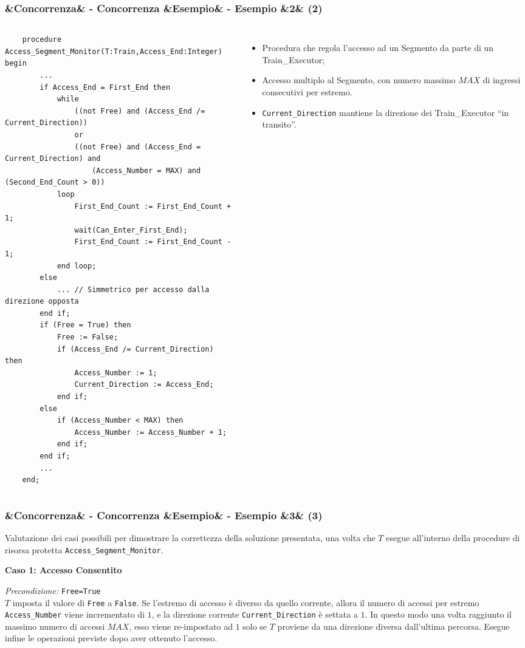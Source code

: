 \documentclass[slidestop,compress,blackandwhite]{beamer}
\newcommand{\ttt}[1]{\texttt{#1}}
\newcommand{\ii}[1]{\textit{#1}}
\newcommand{\cm}[1]{\vspace{#1cm}}
\newcommand{\describe}[2]{
	\textbf{#1}\\
	\begin{addmargin}[2em]{0em}
		#2
	\end{addmargin}
}
\newcommand{\newtitle}[4]{
	#1 
	\ifx&#2&%
	\else
  		\large- #2
	\fi
	\ifx&#3&%
	\else
  		\small- #3
	\fi
	\ifx&#4&%
	\else
  		\normalsize (#4)
	\fi
}
\newcommand{\newframe}[5]{
	\begin{frame}
		\frametitle{\newtitle{#1}{#2}{#3}{#4}}
		#5
	\end{frame}
}
\newcommand{\myitemize}[1]{
	\begin{itemize}\itemsep4pt
	#1
	\end{itemize}
}
\begin{document}
	\begin{frame}[fragile]
	\frametitle{\newtitle{}{Concorrenza}{Esempio}{2}}
	\begin{columns}
	\vspace{-1.1cm}
	\tiny\begin{verbatim}
    procedure Access_Segment_Monitor(T:Train,Access_End:Integer) begin
        ...
        if Access_End = First_End then
            while 
                ((not Free) and (Access_End /= Current_Direction)) 
                or
                ((not Free) and (Access_End = Current_Direction) and 
                    (Access_Number = MAX) and (Second_End_Count > 0)) 
            loop
                First_End_Count := First_End_Count + 1;
                wait(Can_Enter_First_End);
                First_End_Count := First_End_Count - 1;
            end loop;
        else
            ... // Simmetrico per accesso dalla direzione opposta
        end if;
        if (Free = True) then
            Free := False;
            if (Access_End /= Current_Direction) then
                Access_Number := 1;
                Current_Direction := Access_End;
            end if;
        else
            if (Access_Number < MAX) then
                Access_Number := Access_Number + 1;
            end if;
        end if;
        ...
    end;
\end{verbatim}
		\footnotesize
		\myitemize{
			\item Procedura che regola l'accesso ad un Segmento da parte di un Train\_Executor;
			\item Accesso multiplo al Segmento, con numero massimo $MAX$ di ingressi consecutivi per estremo.
			\item \ttt{Current\_Direction} mantiene la direzione dei Train\_Executor ``in transito''.
		}
	\end{columns}
	\end{frame}

	
	\newframe{}{Concorrenza}{Esempio}{3}{
		\footnotesize
		\cm{0.5}
		\justifying Valutazione dei casi possibili per dimostrare la correttezza della soluzione presentata, una volta che $T$ esegue all'interno della procedure di risorsa protetta \ttt{Access\_Segment\_Monitor}.\\
		\cm{0.3}
		\describe{\footnotesize Caso 1: Accesso Consentito}{
			\footnotesize
			\justifying
			\ii{Precondizione:} \ttt{Free=True}\\
			$T$ imposta il valore di \ttt{Free} a \ttt{False}. Se l'estremo di accesso è diverso da quello corrente, allora il numero di accessi per estremo \ttt{Access\_Number} viene incrementato di $1$, e la direzione corrente \ttt{Current\_Direction} è settata a $1$. In questo modo una volta raggiunto il massimo numero di accessi $MAX$, esso viene re-impostato ad $1$ solo se $T$ proviene da una direzione diversa dall'ultima percorsa. Esegue infine le operazioni previste dopo aver ottenuto l'accesso.
		}
	}
	
\end{document}

